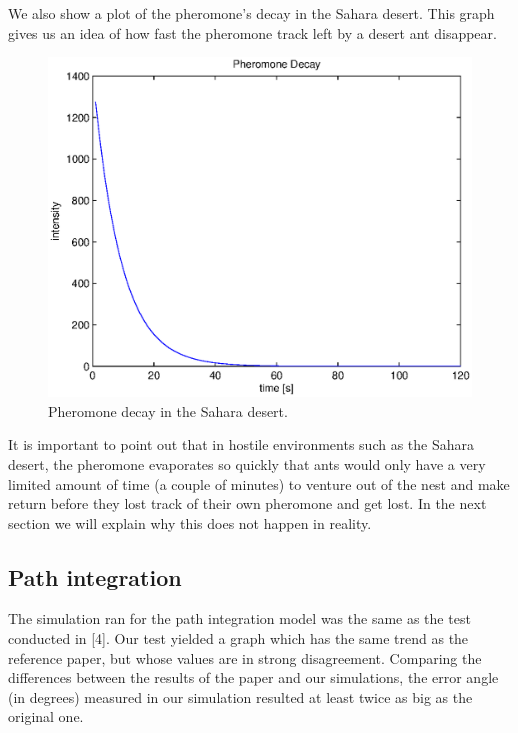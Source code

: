 \documentclass[11pt]{article}
\begin{document}
We also show a plot of the pheromone's decay in the Sahara desert. This graph gives us an idea of how fast the pheromone track left by a desert ant disappear.
\begin{figure}[h!]
	\centering
	\includegraphics[width=.8\textwidth]{../sources/results/pheromoneDecay.eps}
	\caption{Pheromone decay in the Sahara desert.}
\end{figure}

It is important to point out that in hostile environments such as the Sahara desert, the pheromone evaporates so quickly that ants would only have a very limited amount of time (a couple of minutes) to venture out of the nest and make return before they lost track of their own pheromone and get lost. In the next section we will explain why this does not happen in reality.

\subsection{Path integration}
The simulation ran for the path integration model was the same as the test conducted in [4]. Our test yielded a graph which has the same trend as the reference paper, but whose values are in strong disagreement. Comparing the differences between the results of the paper and our simulations, the error angle (in degrees) measured in our simulation resulted at least twice as big as the original one.
\end{document}
